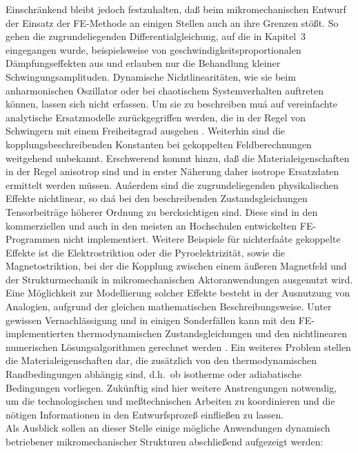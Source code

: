 %
Einschränkend bleibt jedoch festzuhalten, daß beim mikromechanischen
Entwurf der Einsatz der FE-Methode an einigen Stellen auch an ihre Grenzen
stößt. So gehen die zugrundeliegenden Differentialgleichung, auf die in
Kapitel~3 eingegangen wurde, beispielsweise von
geschwindigkeitsproportionalen Dämpfungseffekten
aus und erlauben nur die Behandlung kleiner Schwingungsamplituden.
Dynamische Nichtlinearitäten, wie sie beim anharmonischen Oszillator oder
bei chaotischem Systemverhalten auftreten können, lassen sich nicht
erfassen. Um sie zu beschreiben muá auf vereinfachte analytische
Ersatzmodelle zurückgegriffen werden, die in der Regel von Schwingern mit
einem Freiheitsgrad ausgehen \cite{Pra93,Til93}. Weiterhin sind die
kopplungsbeschreibenden Konstanten bei
gekoppelten Feldberechnungen weitgehend unbekannt. Erschwerend kommt hinzu,
daß die Materialeigenschaften in der Regel anisotrop sind und in erster
Näherung daher isotrope Ersatzdaten ermittelt werden müssen. Auáerdem sind
die zugrundeliegenden physikalischen Effekte nichtlinear, so daá bei den
beschreibenden Zustandsgleichungen Tensorbeiträge höherer Ordnung zu
bercksichtigen sind. Diese sind in den kommerziellen und auch in den
meisten an Hochschulen entwickelten FE-Programmen nicht implementiert.
Weitere Beispiele für nichterfaáte gekoppelte Effekte ist die
Elektrostriktion oder die Pyroelektrizität, sowie die Magnetostriktion, bei
der die Kopplung zwischen einem äußeren Magnetfeld
und der Strukturmechanik in mikromechanischen Aktoranwendungen ausgenutzt
wird. Eine Möglichkeit zur Modellierung solcher Effekte besteht in der
Ausnutzung von Analogien, aufgrund der gleichen mathematischen
Beschreibungsweise. Unter
gewissen Vernachlässigung und in einigen Sonderfällen kann mit den
FE-implementierten thermodynamischen Zustandsgleichungen und den
nichtlinearen numerischen Lösungsalgorithmen gerechnet werden \cite{Goetz}.
Ein weiteres Problem stellen die Materialeigenschaften dar, die zusätzlich von
den thermodynamischen Randbedingungen abhängig sind, d.h.\ ob isotherme oder
adiabatische Bedingungen vorliegen. Zukünftig sind hier weitere Anstrengungen
notwendig, um die technologischen und meßtechnischen Arbeiten zu
koordinieren und die nötigen Informationen in den Entwurfsprozeß
einfließen zu lassen.\\
%
Als Ausblick sollen an dieser Stelle einige mögliche Anwendungen
dynamisch betriebener mikromechanischer Strukturen abschließend
aufgezeigt werden:
%
